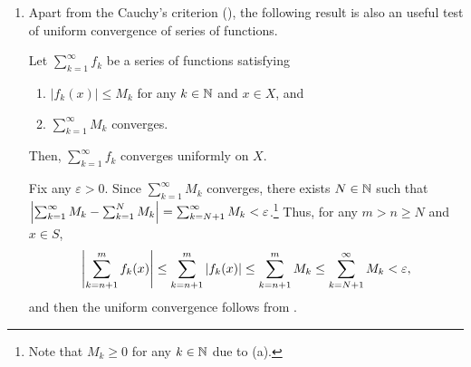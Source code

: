 \begin{enumerate}
\item Apart from the Cauchy's criterion
(), the following result is also an
useful test of uniform convergence of series of functions.

\begin{theorem}
\label{thm:weierstrass-m-test}
Let \(\sum_{k=1}^{\infty}f_k\) be a series of functions satisfying
\begin{enumerate}
\item \(|f_k(x)|\le M_k\) for any \(k\in\mathbb{N}\) and \(x\in X\), and
\item \(\sum_{k=1}^{\infty}M_k\) converges.
\end{enumerate}
Then, \(\sum_{k=1}^{\infty}f_k\) converges uniformly on \(X\).
\end{theorem}
\begin{pf}
Fix any \(\varepsilon>0\).  Since \(\sum_{k=1}^{\infty}M_k\) converges, there
exists \(N\in\mathbb{N}\) such that
\(\qty|\sum_{k=1}^{\infty}M_k-\sum_{k=1}^{N}M_k|=\sum_{k=N+1}^{\infty}M_k<\varepsilon\).\footnote{Note
that \(M_k\ge 0\) for any \(k\in\mathbb{N}\) due to (a).} Thus, for any \(m>n\ge N\)
and \(x\in S\),
\[
\qty|\sum_{k=n+1}^{m}f_k(x)|
\le\sum_{k=n+1}^{m}|f_k(x)|
\le \sum_{k=n+1}^{m}M_k
\le \sum_{k=N+1}^{\infty}M_k
<\varepsilon,
\]
and then the uniform convergence follows from
.
\end{pf}
\end{enumerate}

